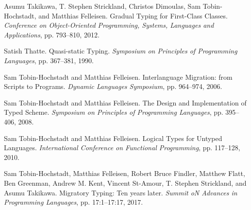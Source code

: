 \documentclass[screen=true, 10pt, acmsmall]{acmart}
\newenvironment{SingleColumn}{\begin{list}{}{\topsep=0pt\partopsep=0pt%
\listparindent=0pt\itemindent=0pt\labelwidth=0pt\leftmargin=0pt\rightmargin=0pt%
\itemsep=0pt\parsep=0pt}\item}{\end{list}}
\newenvironment{AutoBibliography}{\begin{small}}{\end{small}}
\newcommand{\Autobibentry}[1]{\hspace{0.05\linewidth}\parbox[t]{0.95\linewidth}{\parindent=-0.05\linewidth#1\vspace{1.0ex}}}
\begin{document}
\begin{AutoBibliography}
\begin{SingleColumn}
\label{t:x28autobib_x22Asumu_Takikawax2c_Tx2e_Stephen_Stricklandx2c_Christos_Dimoulasx2c_Sam_Tobinx2dHochstadtx2c_and_Matthias_FelleisenGradual_Typing_for_Firstx2dClass_ClassesConference_on_Objectx2dOriented_Programmingx2c_Systemsx2c_Languages_and_Applicationsx2c_ppx2e_793x2dx2d8102012x22x29}\Autobibentry{Asumu Takikawa, T. Stephen Strickland, Christos Dimoulas, Sam Tobin{-}Hochstadt, and Matthias Felleisen. Gradual Typing for First{-}Class Classes. \textit{Conference on Object{-}Oriented Programming, Systems, Languages and Applications}, pp. 793{--}810, 2012.}

\label{t:x28autobib_x22Satish_ThatteQuasix2dstatic_TypingSymposium_on_Principles_of_Programming_Languagesx2c_ppx2e_367x2dx2d3811990x22x29}\Autobibentry{Satish Thatte. Quasi{-}static Typing. \textit{Symposium on Principles of Programming Languages}, pp. 367{--}381, 1990.}

\label{t:x28autobib_x22Sam_Tobinx2dHochstadt_and_Matthias_FelleisenInterlanguage_Migrationx3a_from_Scripts_to_ProgramsDynamic_Languages_Symposiumx2c_ppx2e_964x2dx2d9742006x22x29}\Autobibentry{Sam Tobin{-}Hochstadt and Matthias Felleisen. Interlanguage Migration: from Scripts to Programs. \textit{Dynamic Languages Symposium}, pp. 964{--}974, 2006.}

\label{t:x28autobib_x22Sam_Tobinx2dHochstadt_and_Matthias_FelleisenThe_Design_and_Implementation_of_Typed_SchemeSymposium_on_Principles_of_Programming_Languagesx2c_ppx2e_395x2dx2d4062008x22x29}\Autobibentry{Sam Tobin{-}Hochstadt and Matthias Felleisen. The Design and Implementation of Typed Scheme. \textit{Symposium on Principles of Programming Languages}, pp. 395{--}406, 2008.}

\label{t:x28autobib_x22Sam_Tobinx2dHochstadt_and_Matthias_FelleisenLogical_Types_for_Untyped_LanguagesInternational_Conference_on_Functional_Programmingx2c_ppx2e_117x2dx2d1282010x22x29}\Autobibentry{Sam Tobin{-}Hochstadt and Matthias Felleisen. Logical Types for Untyped Languages. \textit{International Conference on Functional Programming}, pp. 117{--}128, 2010.}

\label{t:x28autobib_x22Sam_Tobinx2dHochstadtx2c_Matthias_Felleisenx2c_Robert_Bruce_Findlerx2c_Matthew_Flattx2c_Ben_Greenmanx2c_Andrew_Mx2e_Kentx2c_Vincent_Stx2dAmourx2c_Tx2e_Stephen_Stricklandx2c_and_Asumu_TakikawaMigratory_Typingx3a_Ten_years_laterSummit_oN_Advances_in_Programming_Languagesx2c_ppx2e_17x3a1x2dx2d17x3a172017x22x29}\Autobibentry{Sam Tobin{-}Hochstadt, Matthias Felleisen, Robert Bruce Findler, Matthew Flatt, Ben Greenman, Andrew M. Kent, Vincent St{-}Amour, T. Stephen Strickland, and Asumu Takikawa. Migratory Typing: Ten years later. \textit{Summit oN Advances in Programming Languages}, pp. 17:1{--}17:17, 2017.}


\end{SingleColumn}
\end{AutoBibliography}
\end{document}
